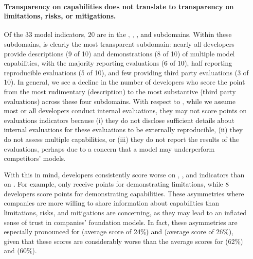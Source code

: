 \paragraph{Transparency on capabilities does not translate to transparency on limitations, risks, or mitigations.}
Of the 33 model indicators, 20 are in the \capabilities, \limitations, \risks, and \modelmitigations subdomains.
Within these subdomains, \capabilities is clearly the most transparent subdomain: nearly all developers provide descriptions (9 of 10) and demonstrations (8 of 10) of multiple model capabilities, with the majority reporting evaluations (6 of 10), half reporting reproducible evaluations (5 of 10), and few providing third party evaluations (3 of 10).
In general, we see a decline in the number of developers who score the point from the most rudimentary (\ie description) to the most substantive (\ie third party evaluations) across these four subdomains.
With respect to \capabilities, while we assume most or all developers conduct internal evaluations, they may not score points on evaluations indicators because (i) they do not disclose sufficient details about internal evaluations for these evaluations to be externally reproducible, (ii) they do not assess multiple capabilities, or (iii) they do not report the results of the evaluations, perhaps due to a concern that a model may underperform competitors' models. 

With this in mind, developers consistently score worse on \limitations, \risks, and \modelmitigations indicators than on \capabilities.
For example, only \cohere receive points for demonstrating limitations, while 8 developers score points for demonstrating capabilities. 
These asymmetries where companies are more willing to share information about capabilities than limitations, risks, and mitigations are concerning, as they may lead to an inflated sense of trust in companies' foundation models. 
In fact, these asymmetries are especially pronounced for \risks (average score of 24\%) and \modelmitigations (average score of 26\%), given that these scores are considerably worse than the average scores for \capabilities (62\%) and \limitations (60\%). 

